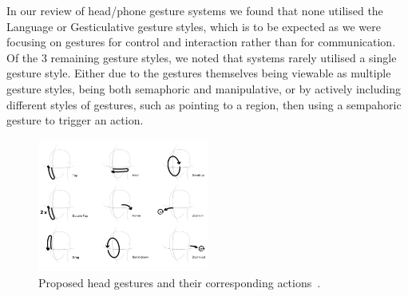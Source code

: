 In our review of head/phone gesture systems we found that none utilised the Language or Gesticulative gesture styles, which is to be expected as we were focusing on gestures for control and interaction rather than for communication.
Of the 3 remaining gesture styles, we noted that systems rarely utilised a single gesture style. Either due to the gestures themselves being viewable as multiple gesture styles, being both semaphoric and manipulative, or by actively including different styles of gestures, such as pointing to a region, then using a sempahoric gesture to trigger an action.

\begin{figure}
    \centering
    \includegraphics[width=0.5\textwidth]{figures/yan2018headgesture_fig2_proposed_gestures.png}
    \caption{\label{fig:yan2018headgesture_proposed_gestures} Proposed head gestures and their corresponding actions~\cite{yan2018headgesture}.}
\end{figure}



